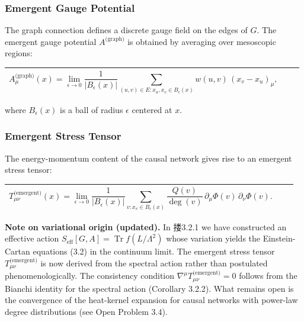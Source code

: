 \documentclass[11pt,a4paper]{article}
\theoremstyle{plain}
\theoremstyle{definition}
\begin{document}
\subsubsection{Emergent Gauge Potential}

The graph connection defines a discrete gauge field on the edges of $G$. The emergent gauge potential $A^{\text{(graph)}}$ is obtained by averaging over mesoscopic regions:

\begin{table}[h]
\centering
\begin{tabular}{|c|c|c|}
\hline
$$A^{\text{(graph)}}_\mu(x) = \lim_{\epsilon \to 0} \frac{1}{|B_\epsilon(x)|} \sum_{(u,v) \in E: x_u, x_v \in B_\epsilon(x)} w(u,v) \, (x_v - x_u)_\mu,$$ \\ \hline
\end{tabular}
\end{table}

where $B_\epsilon(x)$ is a ball of radius $\epsilon$ centered at $x$.

\subsubsection{Emergent Stress Tensor}

The energy-momentum content of the causal network gives rise to an emergent stress tensor:

\begin{table}[h]
\centering
\begin{tabular}{|c|c|c|}
\hline
$$T^{\text{(emergent)}}_{\mu\nu}(x) = \lim_{\epsilon \to 0} \frac{1}{|B_\epsilon(x)|} \sum_{v: x_v \in B_\epsilon(x)} \frac{Q(v)}{\deg(v)} \, \partial_\mu \Phi(v) \, \partial_\nu \Phi(v).$$ \\ \hline
\end{tabular}
\end{table}

\textbf{Note on variational origin (updated).} In 搂3.2.1 we have constructed an effective action $S_{\text{eff}}[G, A] = \operatorname{Tr} f(L/\Lambda^2)$ whose variation yields the Einstein-Cartan equations (3.2) in the continuum limit. The emergent stress tensor $T^{\text{(emergent)}}_{\mu\nu}$ is now derived from the spectral action rather than postulated phenomenologically. The consistency condition $\nabla^\mu T^{\text{(emergent)}}_{\mu\nu} = 0$ follows from the Bianchi identity for the spectral action (Corollary 3.2.2). What remains open is the convergence of the heat-kernel expansion for causal networks with power-law degree distributions (see Open Problem 3.4).
\end{document}
